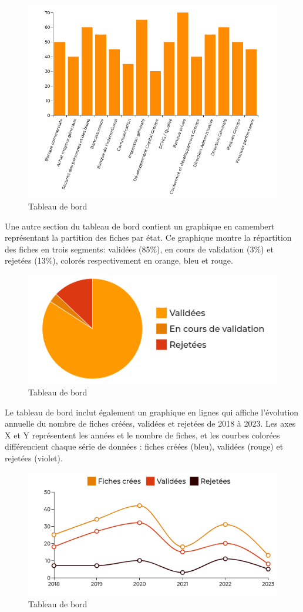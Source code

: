\begin{figure}[H]
    \centering
    \includegraphics[width=.75\textwidth]{images/guis/dashboard1.png}
    \caption{Tableau de bord}
\end{figure}

\noindent Une autre section du tableau de bord contient un graphique en camembert représentant la partition des fiches par état. Ce graphique montre la répartition des fiches en trois segments: validées (85\%), en cours de validation (3\%) et rejetées (13\%), colorés respectivement en orange, bleu et rouge.

\begin{figure}[H]
    \centering
    \includegraphics[width=.5\textwidth]{images/guis/dashboard2.png}
    \caption{Tableau de bord}
\end{figure}

\noindent Le tableau de bord inclut également un graphique en lignes qui affiche l'évolution annuelle du nombre de fiches créées, validées et rejetées de 2018 à 2023. Les axes X et Y représentent les années et le nombre de fiches, et les courbes colorées différencient chaque série de données : fiches créées (bleu), validées (rouge) et rejetées (violet).

\begin{figure}[H]
    \centering
    \includegraphics[width=.7\textwidth]{images/guis/dashboard3.png}
    \caption{Tableau de bord}
\end{figure}


